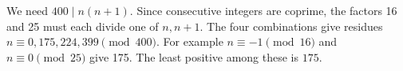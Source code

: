 We need $400\mid n(n+1)$. Since consecutive integers are coprime, the factors 16 and 25 must each divide one of $n,n+1$. The four combinations give residues $n\equiv0,175,224,399\pmod{400}$. For example $n\equiv-1\pmod{16}$ and $n\equiv0\pmod{25}$ give 175. The least positive among these is $\boxed{175}$.
